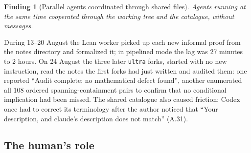 \documentclass[11pt,a4paper]{article}
\newtheorem{finding}{Finding}
\newcommand{\ttt}[1]{\texttt{#1}}
\begin{document}
\begin{finding}[Parallel agents coordinated through shared files]\label{f:shared}
Agents running at the same time cooperated through the working tree and the catalogue, without
messages.
\end{finding}
During 13--20 August the Lean worker picked up each new informal proof from the notes directory and
formalized it; in pipelined mode the lag was 27 minutes to 2 hours. On 24 August the three later \ttt{ultra}
forks, started with no new instruction, read the notes the first forks had just written and audited them: one
reported ``Audit complete; no mathematical defect found'', another enumerated all 108 ordered
spanning-containment pairs to confirm that no conditional implication had been missed. The shared catalogue
also caused friction: Codex once had to correct its terminology after the author noticed that ``Your
description, and claude's description does not match'' (A.31).

\subsection{The human's role}
\end{document}
